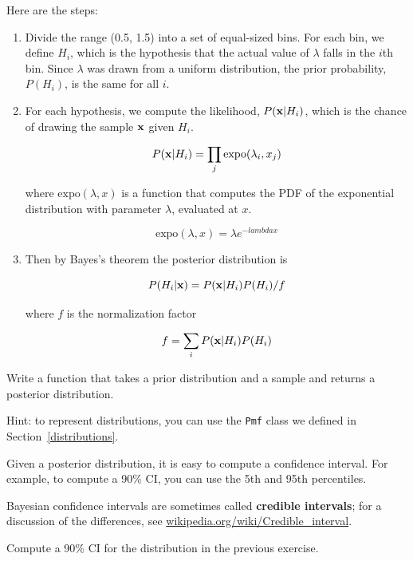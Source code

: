 \documentclass[12pt]{book}
\begin{document}
Here are the steps:

\begin{enumerate}

\item Divide the range (0.5, 1.5) into a set of equal-sized bins.
For each bin, we define $H_i$, which is the hypothesis that the
actual value of $\lambda$ falls in the $i$th bin.
Since $\lambda$ was drawn from a uniform distribution, the prior
probability, $P(H_i)$, is the same for all $i$.

\item For each hypothesis, we compute the likelihood, $P(\mathbf{x}|H_i)$,
which is the chance of drawing the sample $\mathbf{x}$ given $H_i$.

\[ P(\mathbf{x}|H_i) = \prod_j \mathrm{expo}(\lambda_i, x_j)  \]

where $\mathrm{expo}(\lambda, x)$ is a function that
computes the PDF of the exponential distribution with parameter $\lambda$,
evaluated at $x$.

\[ \mathrm{expo}(\lambda, x) = \lambda e^{-lambda x}\]

\item Then by Bayes's theorem the posterior distribution is

\[ P(H_i|\mathbf{x}) =  P(\mathbf{x}|H_i) P(H_i) / f \]

where $f$ is the normalization factor

\[ f = \sum_i P(\mathbf{x}|H_i) P(H_i) \]

\end{enumerate}


\begin{ex}

Write a function that takes a prior distribution and a sample and
returns a posterior distribution.

Hint: to represent distributions, you can use
the {\tt Pmf} class we defined in Section~\ref{distributions}.

\end{ex}

\begin{ex}

Given a posterior distribution, it is easy to compute a confidence
interval.  For example, to compute a 90\% CI, you can
use the 5th and 95th percentiles.

Bayesian confidence intervals are sometimes called {\bf credible
intervals}; for a discussion of the differences, see
\url{wikipedia.org/wiki/Credible_interval}.

Compute a 90\% CI for the distribution in the previous exercise.

\end{ex}
\end{document}
